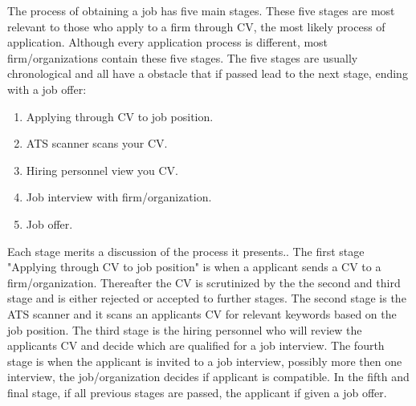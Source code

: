 The process of obtaining a job has five main stages.
These five stages are most relevant to those who apply to a firm through CV, the most likely process of application.
Although every application process is different, most firm/organizations contain these five stages.
The five stages are usually chronological and all have a obstacle that if passed lead to the next stage, ending with a job offer:
\begin{enumerate}
   \item Applying through CV to job position.
   \item ATS scanner scans your CV.
   \item Hiring personnel view you CV.
   \item Job interview with firm/organization.
   \item Job offer.\cite{Process_steps_unemployment}
\end{enumerate}
Each stage merits a discussion of the process it presents..
The first stage "Applying through CV to job position" is when a applicant sends a CV to a firm/organization.
Thereafter the CV is scrutinized by the the second and third stage and is either rejected or accepted to further stages.
The second stage is the ATS scanner and it scans an applicants CV for relevant keywords based on the job position.
The third stage is the hiring personnel who will review the applicants CV and decide which are qualified for a job interview.
The fourth stage is when the applicant is invited to a job interview, possibly more then one interview, the job/organization decides if applicant is compatible.
In the fifth and final stage, if all previous stages are passed, the applicant if given a job offer. \\


